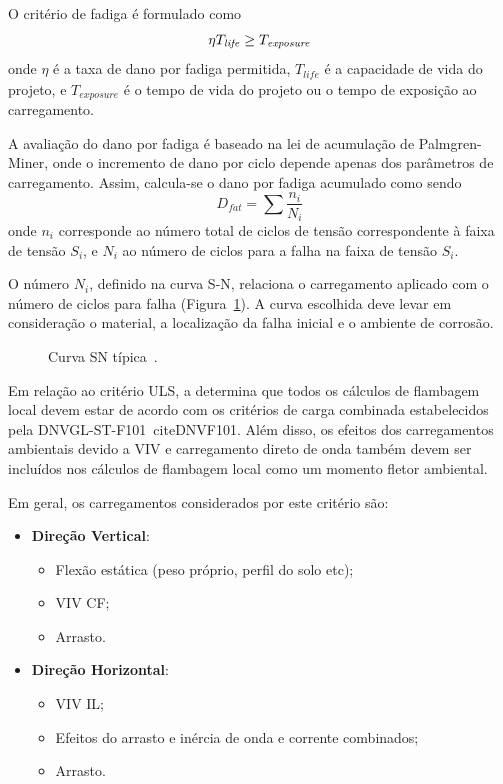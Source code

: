 O critério de fadiga é formulado como
\begin{equation}
\label{eq:viv-eqfat}
\eta T_\mathit{life} \geq T_\mathit{exposure}\\
\end{equation}
onde $\eta$ é a taxa de dano por fadiga permitida, $T_\mathit{life}$ é a capacidade de vida do projeto, e
$T_\mathit{exposure}$ é o tempo de vida do projeto ou o tempo de exposição ao carregamento.

A avaliação do dano por fadiga é baseado na lei de acumulação de Palmgren-Miner, onde o incremento de dano por ciclo depende apenas dos parâmetros de carregamento.
Assim, calcula-se o dano por fadiga acumulado como sendo
\begin{equation}
\label{eq:viv-eqpm}
D_\mathit{fat} = \sum \frac{n_i}{N_i}
\end{equation}
onde $n_i$ corresponde ao número total de ciclos de tensão correspondente à faixa de tensão $S_i$, e $N_i$ ao número de ciclos para a falha na faixa de tensão $S_i$.

O número $N_i$, definido na curva S-N, relaciona o carregamento aplicado com o número de ciclos para falha (Figura~\ref{fig:viv-sncurve}).
A curva escolhida deve levar em consideração o material, a localização da falha inicial e o ambiente de corrosão.
\begin{figure}[hbt!]
\begin{center}
\caption{Curva SN típica~\cite{DNV2017}.}
\label{fig:viv-sncurve}
\end{center}
\vspace{-0.7cm}
\end{figure}

\sloppy
Em relação ao critério ULS, a  determina que todos os cálculos de flambagem local devem estar de acordo com os critérios de carga combinada estabelecidos pela \mbox{DNVGL-ST-F101}~cite{DNVF101}.
Além disso, os efeitos dos carregamentos ambientais devido a VIV e carregamento direto de onda também devem ser incluídos nos cálculos de flambagem local como um momento fletor ambiental.

Em geral, os carregamentos considerados por este critério são:
\begin{itemize}
	\item \textbf{Direção Vertical}:
	\begin{itemize}
		\item Flexão estática (peso próprio, perfil do solo etc);
		\item VIV CF;
		\item Arrasto.
	\end{itemize}
	\item \textbf{Direção Horizontal}:
	\begin{itemize}
		\item VIV IL;
		\item Efeitos do arrasto e inércia de onda e corrente combinados;
		\item Arrasto.
	\end{itemize}
\end{itemize}


